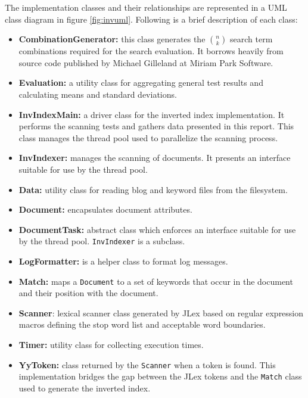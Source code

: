 \documentclass[10pt]{report}
\begin{document}
The implementation classes and their relationships are represented in a UML
class diagram in figure \ref{fig:invuml}. Following is a brief
description of each class:

\begin{itemize}
\item \textbf{CombinationGenerator:} this class generates the ${n
  \choose k}$ search term combinations required for the search
  evaluation. It borrows heavily from source code published by Michael
  Gilleland at Miriam Park Software.

\item \textbf{Evaluation:} a utility class for aggregating general
  test results and calculating means and standard deviations.

\item \textbf{InvIndexMain:} a driver class for the inverted index
  implementation. It performs the scanning tests and gathers data
  presented in this report. This class manages the thread pool used to
  parallelize the scanning process.

\item \textbf{InvIndexer:} manages the scanning of documents. It
  presents an interface suitable for use by the thread pool.

\item \textbf{Data:} utility class for reading blog and keyword files
  from the filesystem.

\item \textbf{Document:} encapsulates document attributes.

\item \textbf{DocumentTask:} abstract class which enforces an
  interface suitable for use by the thread pool. \texttt{InvIndexer}
  is a subclass.

\item \textbf{LogFormatter:} is a helper class to format log messages.

\item \textbf{Match:} maps a \texttt{Document} to a set of keywords
  that occur in the document and their position with the document.

\item \textbf{Scanner}: lexical scanner class generated by JLex based
  on regular expression macros defining the stop word list and
  acceptable word boundaries.

\item \textbf{Timer:} utility class for collecting execution times.

\item \textbf{YyToken:} class returned by the \texttt{Scanner} when a
  token is found. This implementation bridges the gap between the JLex
  tokens and the \texttt{Match} class used to generate the inverted
  index.
\end{itemize}
\end{document}
